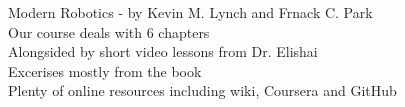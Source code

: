 \documentclass[preview]{standalone}
\begin{document}
Modern Robotics - by Kevin M. Lynch and Frnack C. Park\\Our course deals with 6 chapters\\Alongsided by short video lessons from Dr. Elishai\\Excerises mostly from the book\\Plenty of online resources including wiki, Coursera and GitHub\\
\end{document}
